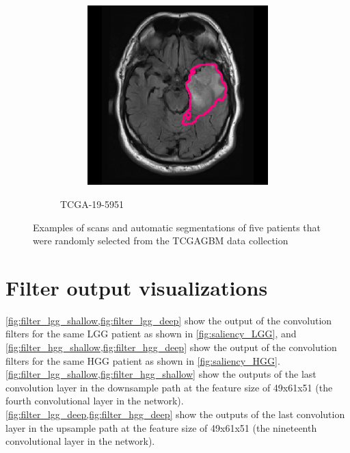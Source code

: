 \begin{subappendices}
\begin{figure}[htbp]
\begin{subfigure}[b]{0.8\textwidth}
\begin{subfigure}[b]{0.215\textwidth}
        \end{subfigure}
        \hfill
        \begin{subfigure}[b]{0.215\textwidth}
        \includegraphics[width=\textwidth, clip, trim=2.5cm 0.5cm 2.5cm 0.5cm]{Figures/Random_segs/FLAIR_TCGA-19-5951.png}
        \end{subfigure}
        \caption{TCGA-19-5951}
    \end{subfigure}
    \caption{Examples of scans and automatic segmentations of five patients that were randomly selected from the \acrshort{TCGAGBM} data collection}\label{fig:seg_examples_HGG}
\end{figure}

\clearpage



\section{Filter output visualizations}\label{app:filter_vis}

\cref{fig:filter_lgg_shallow,fig:filter_lgg_deep} show the output of the convolution filters for the same \gls{LGG} patient as shown in \cref{fig:saliency_LGG}, and \cref{fig:filter_hgg_shallow,fig:filter_hgg_deep}  show the output of the convolution filters for the same \gls{HGG} patient as shown in \cref{fig:saliency_HGG}.
\cref{fig:filter_lgg_shallow,fig:filter_hgg_shallow} show the outputs of the last convolution layer in the downsample path at the feature size of 49x61x51 (the fourth convolutional layer in the network).
\cref{fig:filter_lgg_deep,fig:filter_hgg_deep} show the outputs of the last convolution layer in the upsample path at the feature size of 49x61x51 (the nineteenth convolutional layer in the network).


\end{subappendices}
